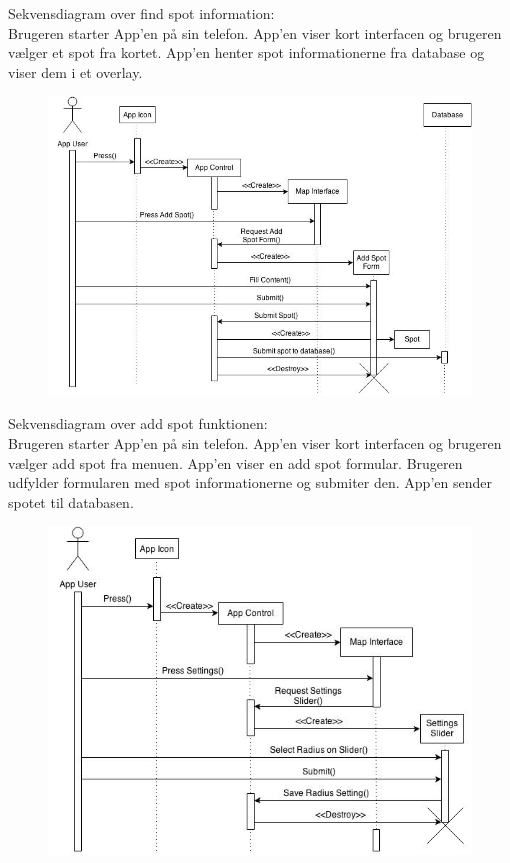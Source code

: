 \documentclass[12pt]{article}
\begin{document}
Sekvensdiagram over find spot information:\\
Brugeren starter App'en på sin telefon. App'en viser kort interfacen og brugeren vælger et spot fra kortet. 
App'en henter spot informationerne fra database og viser dem i et overlay.
\newpage

\begin{figure}[h]
\includegraphics[scale = 0.5]{sekdia2}
\end{figure}

Sekvensdiagram over add spot funktionen:\\
Brugeren starter App'en på sin telefon. App'en viser kort interfacen og brugeren vælger add spot fra menuen.
App'en viser en add spot formular. Brugeren udfylder formularen med spot informationerne og submiter den.
App'en sender spotet til databasen.

\newpage

\begin{figure}[h]
\includegraphics[scale = 0.5]{sekdia3}
\end{figure}
\end{document}

